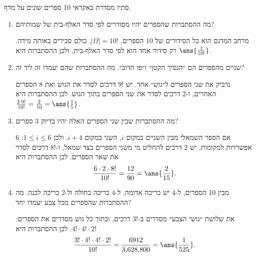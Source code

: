 סתיו מסדרת באקראי 10 ספרים שונים על מדף.
\begin{enumerate}
\item מה ההסתברות שהספרים יהיו מסודרים לפי סדר האלף-בית של שמותיהם?
\begin{solbox}
מרחב המדגם הוא כל הסידורים של 10 הספרים, $|\Omega|=10!$, כולם סבירים באותה מידה. רק סידור אחד הוא לפי סדר האלף-בית, ולכן ההסתברות היא $\ans{\frac1{10!}}$.
\end{solbox}
\item שניים מהספרים הם ״הנסיך הקטן״ ו״פו הדוב״. מה ההסתברות שהם יעמדו זה ליד זה?
\begin{solbox}
נדביק את שני הספרים ל״גוש״ אחד. יש $9!$ דרכים לסדר את הגוש ואת 8 הספרים האחרים, ו-2 דרכים לסדר את שני הספרים בתוך הגוש. לכן ההסתברות היא $\frac{2\cdot9!}{10!}=\frac2{10}=\ans{\frac15}$.
\end{solbox}
\item מה ההסתברות שבין שני הספרים האלה יהיו בדיוק 3 ספרים?
\begin{solbox}
אם הספר השמאלי מבין השניים במקום $i$, השני במקום $i+4$, ולכן $1\le i\le6$: 6 אפשרויות למקומות. יש 2 דרכים להחליט מי משני הספרים בצד שמאל, ו-$8!$ דרכים לסדר את שאר הספרים. לכן ההסתברות היא
\[
\frac{6\cdot2\cdot8!}{10!}=\frac{12}{90}=\ans{\frac2{15}}.
\]
\end{solbox}
\item מבין 10 הספרים, ל-4 יש כריכה אדומה, ל-4 כריכה כחולה ול-2 כריכה לבנה. מה ההסתברות שהספרים מכל צבע יעמדו יחד?
\begin{solbox}
את שלושת ״גושי הצבע״ מסדרים ב-$3!$ דרכים, ובתוך כל גוש מסדרים את הספרים: $4!\cdot4!\cdot2!$. לכן ההסתברות היא
\[
\frac{3!\cdot4!\cdot4!\cdot2!}{10!}=\frac{6912}{3{,}628{,}800}=\ans{\frac1{525}}.
\]
\end{solbox}
\end{enumerate}
